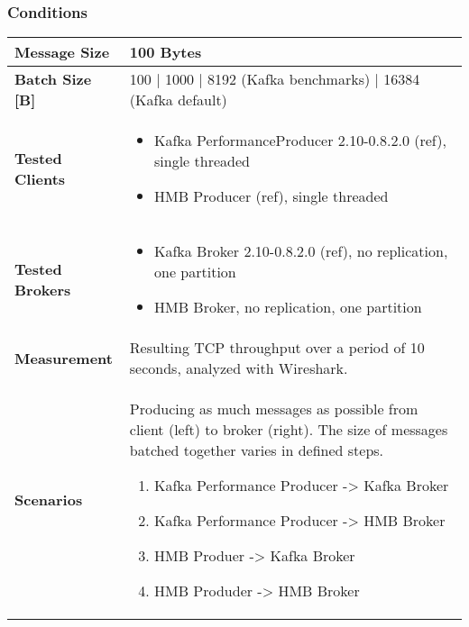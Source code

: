 \subsubsection{Conditions}
\begin{table}[H]
\begin{tabular}{|l| p{12cm}|} \hline
{\bf Message Size}   & 100 Bytes \\ \hline
{\bf Batch Size [B]} & 100 | 1000 | 8192 (Kafka benchmarks) | 16384 (Kafka default) \\ \hline
{\bf Tested Clients} &
    \begin{itemize}
        \item Kafka PerformanceProducer 2.10-0.8.2.0 (ref), single threaded
        \item HMB Producer (ref), single threaded
    \end{itemize}\\ \hline
{\bf Tested Brokers} &
    \begin{itemize}
        \item Kafka Broker 2.10-0.8.2.0 (ref), no replication, one partition
        \item HMB Broker, no replication, one partition
    \end{itemize}\\ \hline
{\bf Measurement} & Resulting TCP throughput over a period of 10 seconds, analyzed with
    Wireshark. \\ \hline
{\bf Scenarios} & Producing as much messages as possible from client (left) to broker (right).
    The size of messages batched together varies in defined steps.
    \begin{enumerate}
        \item Kafka Performance Producer -> Kafka Broker
        \item Kafka Performance Producer -> HMB Broker
        \item HMB Produer -> Kafka Broker
        \item HMB Produder -> HMB Broker
    \end{enumerate} \\ \hline
\end{tabular}
\end{table}

